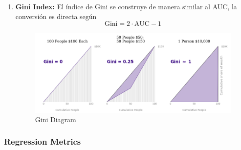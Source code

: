 \begin{enumerate}
    \item \textbf{Gini Index: } El índice de Gini se construye de manera similar al AUC, la conversión es directa según 
    $$ 
    \text{Gini} = 2 \cdot \text{AUC} - 1 
    $$
    \begin{figure}[H]
    \center
    \includegraphics[scale=0.3]{notebooks/Others/img/gini_diagram.png}
    \caption{Gini Diagram}
    \end{figure}
    
\end{enumerate}

\subsubsection{Regression Metrics}

